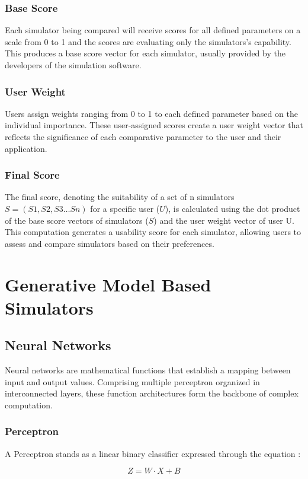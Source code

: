 \documentclass[12pt,twoside,a4paper,parskip]{scrbook} %
\begin{document}
\subsection{Base Score}
Each simulator being compared will receive scores for all defined parameters on a scale from 0 to 1 and the scores are evaluating only the simulators's capability. This produces a base score vector for each simulator, usually provided by the developers of the simulation software.

\subsection{User Weight}
Users assign weights ranging from 0 to 1 to each defined parameter based on the individual importance. These user-assigned scores create a user weight vector that reflects the significance of each comparative parameter to the user and their application.

\subsection{Final Score}
The final score, denoting the suitability of a set of n simulators $S = (S1, S2, S3… Sn)$ for a specific user ($U$), is calculated using the dot product of the base score vectors of simulators ($S$) and the user weight vector of user U. This computation generates a usability score for each simulator, allowing users to assess and compare simulators based on their preferences.

\chapter{Generative Model Based Simulators}
\section{Neural Networks}
Neural networks are mathematical functions that establish a mapping between input and output values. Comprising multiple perceptron organized in interconnected layers, these function architectures form the backbone of complex computation.

\subsection{Perceptron}
A Perceptron stands as a linear binary classifier expressed through the equation \cite{perceptron} :

\[Z = W \cdot X + B\]
\end{document}

